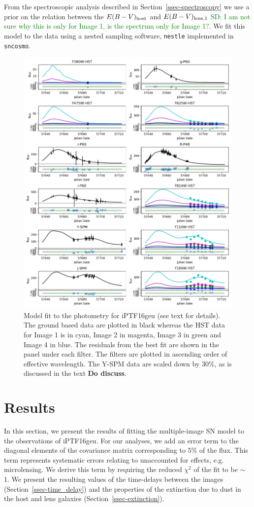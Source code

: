 \documentclass[a4paper,fleqn,usenatbib]{mnras}
\newcommand{\sd}[1]{\textcolor{green}{SD: #1}}
\begin{document}
From the spectroscopic analysis described in Section~\ref{ssec-spectroscopy}
we use a prior on the relation between the $E(B-V)_{\rm host}$  and $E(B-V)_{\rm lens, 1}$ \sd{I am not sure why this is only for Image 1, is the spectrum only for Image 1?}. We fit this model to the data using a nested sampling software, \texttt{nestle} implemented in \texttt{sncosmo}. 

\begin{figure}
    \centering
    \includegraphics[width=.9\textwidth]{16geu_lcfit.png}
    \caption{Model fit to the photometry for iPTF16geu (see text for details). The ground based data are plotted in black whereas the HST data for Image 1 is in cyan, Image 2 in magenta, Image 3 in green and Image 4 in blue. The residuals from the best fit are shown in the panel under each filter. The filters are plotted in ascending order of effective wavelength. The Y-SPM data are scaled down by 30$\%$, as is discussed in the text {\bf Do discuss}.  }
    \label{fig:16geu_lc}
\end{figure}

\section{Results}
\label{sec:results}
In this section, we present the results of fitting the multiple-image SN model to the observations of iPTF16geu. For our analyses, we add an error term to the diagonal elements of the covariance matrix corresponding to 5$\%$ of the flux. This term represents systematic errors relating to unaccounted for effects, e.g. microlensing. We derive this term by requiring the reduced $\chi^2$ of the fit to be $\sim$ 1. 
 We present the resulting values of the time-delays between the images (Section~\ref{ssec-time_delay}) and the properties of the extinction due to dust in the host and lens galaxies (Section~\ref{ssec-extinction}). 
\end{document}
